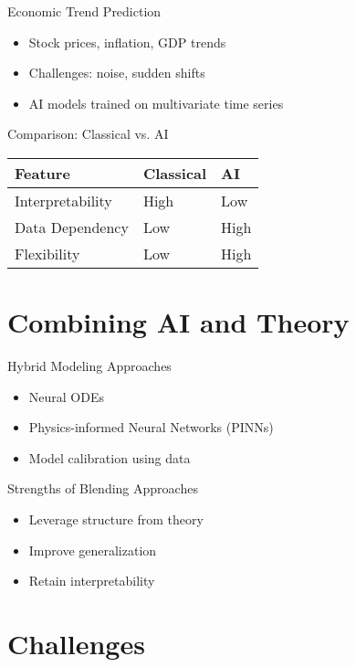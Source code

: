 \documentclass[xcolor=table]{beamer}
\begin{document}
\begin{frame}{Economic Trend Prediction}
    \begin{itemize}
        \item Stock prices, inflation, GDP trends
        \item Challenges: noise, sudden shifts
        \item AI models trained on multivariate time series
    \end{itemize}
\end{frame}

\begin{frame}{Comparison: Classical vs. AI}
    \begin{tabular}{@{}lll@{}}
        \toprule
        Feature & Classical & AI \\
        \midrule
        Interpretability & High & Low \\
        Data Dependency & Low & High \\
        Flexibility & Low & High \\
        \bottomrule
    \end{tabular}
\end{frame}

\section{Combining AI and Theory}

\begin{frame}{Hybrid Modeling Approaches}
    \begin{itemize}
        \item Neural ODEs
        \item Physics-informed Neural Networks (PINNs)
        \item Model calibration using data
    \end{itemize}
\end{frame}

\begin{frame}{Strengths of Blending Approaches}
    \begin{itemize}
        \item Leverage structure from theory
        \item Improve generalization
        \item Retain interpretability
    \end{itemize}
\end{frame}

\section{Challenges}
\end{document}
